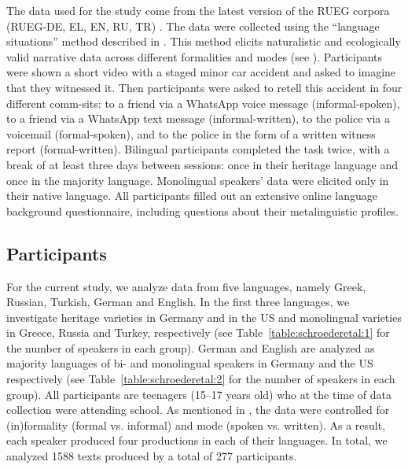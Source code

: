 \documentclass[output=paper,colorlinks,citecolor=brown]{langscibook}
\begin{document}
The data used for the study come from the latest version of the RUEG corpora (RUEG-DE, EL, EN, RU, TR) \parencite{RUEGcorpus2024}. The data were collected using the “language situations” method described in \textcite{wiese2020language}. This method elicits naturalistic and ecologically valid narrative data across different formalities and modes (see \cite{chapters/02}). Participants were shown a short video with a staged minor car accident and asked to imagine that they witnessed it. Then participants were asked to retell this accident in four different comm-sits: to a friend via a WhatsApp voice message (informal-spoken), to a friend via a WhatsApp text message (informal\hyp written), to the police via a voicemail (formal-spoken), and to the police in the form of a written witness report (formal-written). Bilingual participants completed the task twice, with a break of at least three days between sessions: once in their heritage language and once in the majority language. Monolingual speakers’ data were elicited only in their native language. All participants filled out an extensive online language background questionnaire, including questions about their metalinguistic profiles. 

\subsection{Participants} \label{sec:schroederetal:2.2}

For the current study, we analyze data from five languages, namely Greek, Russian, Turkish, German and English. In the first three languages, we investigate heritage varieties in Germany and in the US and monolingual varieties in Greece, Russia and Turkey, respectively (see Table~\ref{table:schroederetal:1} for the number of speakers in each group). German and English are analyzed as majority languages of bi- and monolingual speakers in Germany and the US respectively (see Table~\ref{table:schroederetal:2} for the number of speakers in each group). All participants are teenagers (15--17 years old) who at the time of data collection were attending school.
As mentioned in , the data were controlled for (in)formality (formal vs. informal) and mode (spoken vs. written). As a result, each speaker produced four productions in each of their languages. In total, we analyzed 1588 texts produced by a total of 277 participants. 
\end{document}
